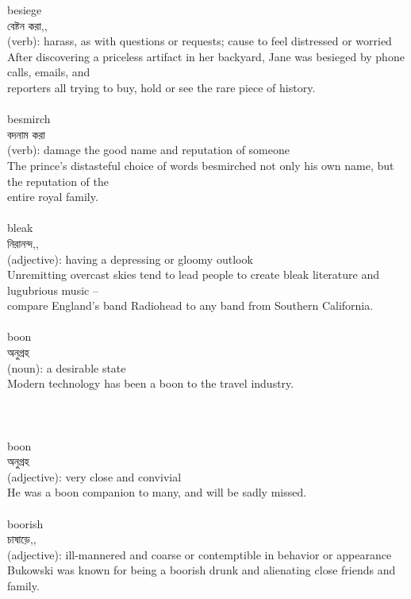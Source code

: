 \documentclass{article}
\begin{document}
{besiege}\\
{বেষ্টন করা,,}\\
{(verb): harass, as with questions or requests; cause to feel distressed or worried\\After discovering a priceless artifact in her backyard, Jane was besieged by phone calls, emails, and\\reporters all trying to buy, hold or see the rare piece of history.\\}\\
{besmirch}\\
{বদনাম করা}\\
{(verb): damage the good name and reputation of someone\\The prince's distasteful choice of words besmirched not only his own name, but the reputation of the\\entire royal family.\\}\\
{bleak}\\
{নিরানন্দ,,}\\
{(adjective): having a depressing or gloomy outlook\\Unremitting overcast skies tend to lead people to create bleak literature and lugubrious music --\\compare England's band Radiohead to any band from Southern California.\\}\\
{boon}\\
{অনুগ্রহ}\\
{(noun): a desirable state\\Modern technology has been a boon to the travel industry.\\\\                                                                                \\}\\
{boon}\\
{অনুগ্রহ}\\
{(adjective): very close and convivial\\He was a boon companion to many, and will be sadly missed.\\}\\
{boorish}\\
{চাষাড়ে,,}\\
{(adjective): ill-mannered and coarse or contemptible in behavior or appearance\\Bukowski was known for being a boorish drunk and alienating close friends and family.\\}\\
\end{document}
